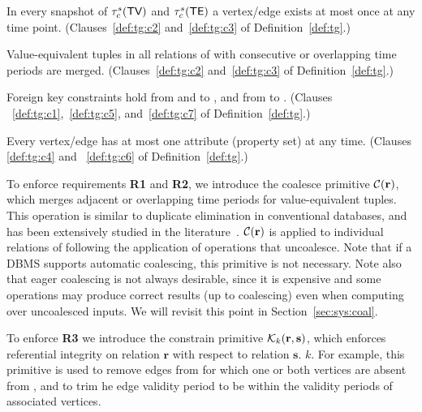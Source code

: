 \begin{description}[noitemsep]

\item [R1 No duplicates] In every snapshot of $\tau^s_c (\textsf{TV})$ and
  $\tau^s_c (\textsf{TE})$ a vertex/edge exists at most once at any time
  point. (Clauses~\ref{def:tg:c2} and~\ref{def:tg:c3} of
  Definition~\ref{def:tg}.)

\item [R2: Coalesced] Value-equivalent tuples in all relations of \tv
  with consecutive or overlapping time periods are
  merged. (Clauses~\ref{def:tg:c2} and~\ref{def:tg:c3} of
  Definition~\ref{def:tg}.)

\item [R3: Referential integrity] Foreign key constraints hold from
  \te and \tav to \tv, and from \tae to \te.
  (Clauses\\~\ref{def:tg:c1},~\ref{def:tg:c5}, and~\ref{def:tg:c7} of
  Definition~\ref{def:tg}.)

\item [R4: Single attribute] Every vertex/edge has at most one
  attribute (property set) at any time. (Clauses\\\ref{def:tg:c4} and
  ~\ref{def:tg:c6} of Definition~\ref{def:tg}.)
  
\end{description}
\vspace{-1ex}

To enforce requirements {\bf R1} and {\bf R2}, we introduce the
coalesce primitive $\mathcal{C}(\mathbf{r})$, which merges adjacent or overlapping
time periods for value-equivalent tuples.  This operation is similar
to duplicate elimination in conventional databases, and has been
extensively studied in the
literature~\cite{DBLP:conf/vldb/BohlenSS96,DBLP:journals/sigmod/Zimanyi06}.
$\mathcal{C}(\mathbf{r})$ is applied to individual relations of \tve following the
application of operations that uncoalesce.  Note that if a DBMS
supports automatic coalescing, this primitive is not necessary.  Note
also that eager coalescing is not always desirable, since it is
expensive and some operations may produce correct results (up to
coalescing) even when computing over uncoalesced inputs.  We will
revisit this point in Section~\ref{sec:sys:coal}.


To enforce {\bf R3} we introduce the constrain primitive
$\mathcal{K}_{k}(\mathbf{r},\mathbf{s})$, which enforces referential integrity on relation
$\mathbf{r}$ with respect to relation $\mathbf{s}$.%
$k$.  For example, this primitive is used to remove edges from \te for
which one or both vertices are absent from \tv, and to trim he edge
validity period to be within the validity periods of associated
vertices. 

